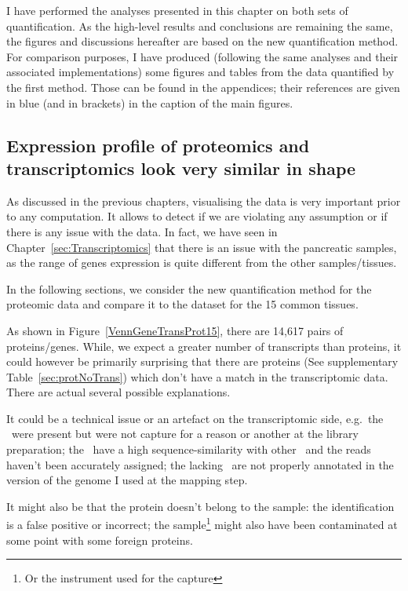 I have performed the analyses presented in this chapter on both sets of
quantification. As the high-level results and conclusions are remaining the same,
the figures and discussions hereafter are based on
the new quantification method. For comparison purposes,
I have produced (following the same analyses and their associated implementations)
some figures and tables from the data quantified by the first method.
Those can be found in the appendices; their references
are given in blue (and in brackets) in the caption of the main figures.



\subsection{Expression profile of proteomics and transcriptomics look very
similar in shape}
\label{sec:IntegrationExpProfileSim}

As discussed in the previous chapters, visualising the data is very important
prior to any computation. It allows to detect if we are violating
any assumption or if there is any issue with the data. In fact, we have seen in
Chapter~\ref{sec:Transcriptomics} that there is an issue with the pancreatic
samples, as the range of genes expression is quite different from the other
samples/tissues.

In the following sections, we consider the new quantification method for the
proteomic data and compare it to the  dataset for the
15 common tissues.

As shown in Figure~\ref{VennGeneTransProt15}, there are 14,617 pairs of
proteins/genes. While, we expect a greater number of transcripts than proteins,
it could however be primarily surprising that there are proteins
(See supplementary Table~\ref{sec:protNoTrans}) which don't have
a match in the transcriptomic data. There are actual several possible explanations.

It could be a technical issue or an artefact on the transcriptomic side, e.g.\
the \mRNAs\ were present but were not capture for a reason or another at the
library preparation; the \mRNAs\ have a high sequence-similarity with other \mRNAs\
and the reads haven't been accurately assigned; the lacking \mRNAs\ are not properly
annotated in the version of the genome I used at the mapping step.

It might also be that the protein doesn't belong to the sample: the identification
is a false positive or incorrect; the sample\footnote{Or the instrument used for
the capture} might also have been contaminated at some point with some foreign
proteins.


